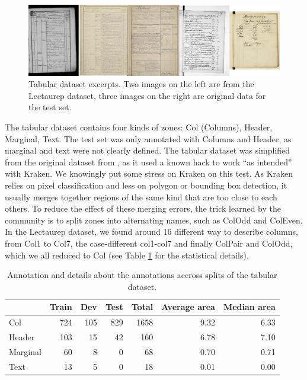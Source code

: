 \documentclass{jdmdh}
\begin{document}
\begin{figure}
    \centering
    \includegraphics[width=\linewidth]{images/table.jpg}
    \caption{Tabular dataset excerpts. Two images on the left are from the Lectaurep dataset, three images on the right are original data for the test set.}
    \label{fig:dataset:table}
\end{figure}

The tabular dataset contains four kinds of zones: Col (Columns), Header, Marginal, Text. The test set was only annotated with Columns and Header, as marginal and text were not clearly defined. The tabular dataset was simplified from the original dataset from \citet{p2021notaires}, as it used a known hack to work ``as intended'' with Kraken. We knowingly put some stress on Kraken on this test. As Kraken relies on pixel classification and less on polygon or bounding box detection, it usually merges together regions of the same kind that are too close to each others. To reduce the effect of these merging errors, the trick learned by the community is to split zones into alternating names, such as ColOdd and ColEven. In the Lectaurep dataset, we found around 16 different way to describe columns, from Col1 to Col7, the case-different col1-col7 and finally ColPair and ColOdd, which we all reduced to Col (see Table \ref{tab:comp:tabular} for the statistical details).

\begin{table}[]
    \centering
    \begin{tabular}{l|rrr|r|rr}
    \hline
              &   Train &   Dev &   Test &   Total &   Average area &   Median area \\
    \hline
     Col      &     724 &   105 &    829 &    1658 &           9.32 &          6.33 \\
     Header   &     103 &    15 &     42 &     160 &           6.78 &          7.10 \\
     Marginal &      60 &     8 &      0 &      68 &           0.70 &          0.71 \\
     Text     &      13 &     5 &      0 &      18 &           0.01 &          0.00 \\
    \hline
    \end{tabular}
    \caption{Annotation and details about the annotations accross splits of the tabular  dataset.}
    \label{tab:comp:tabular}
\end{table}
\end{document}
